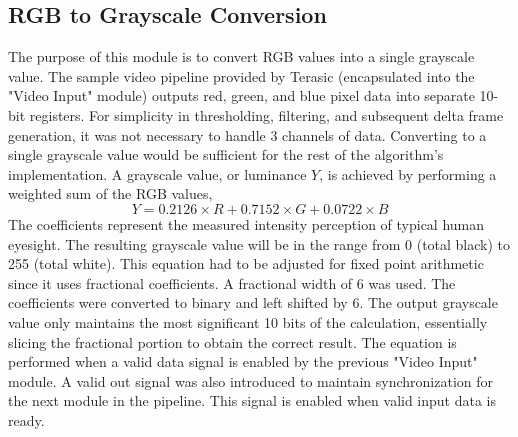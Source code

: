 \documentclass[11pt]{article} %
\begin{document}
\subsection{RGB to Grayscale Conversion}
The purpose of this module is to convert RGB values into a single grayscale value. The sample video pipeline provided by Terasic (encapsulated into the "Video Input" module) outputs red, green, and blue pixel data into separate 10-bit registers. For simplicity in thresholding, filtering, and subsequent delta frame generation, it was not necessary to handle 3 channels of data. Converting to a single grayscale value would be sufficient for the rest of the algorithm's implementation. A grayscale value, or luminance $Y$, is achieved by performing a weighted sum of the RGB values,
\begin{equation}
Y =  0.2126\times R + 0.7152\times G + 0.0722\times B
\end{equation}
The coefficients represent the measured intensity perception of typical human eyesight. The resulting grayscale value will be in the range from 0 (total black) to 255 (total white). This equation had to be adjusted for fixed point arithmetic since it uses fractional coefficients. A fractional width of 6 was used. The coefficients were converted to binary and left shifted by 6. The output grayscale value only maintains the most significant 10 bits of the calculation, essentially slicing the fractional portion to obtain the correct result. The equation is performed when a valid data signal is enabled by the previous "Video Input" module. A valid out signal was also introduced to maintain synchronization for the next module in the pipeline. This signal is enabled when valid input data is ready. 
\end{document}
